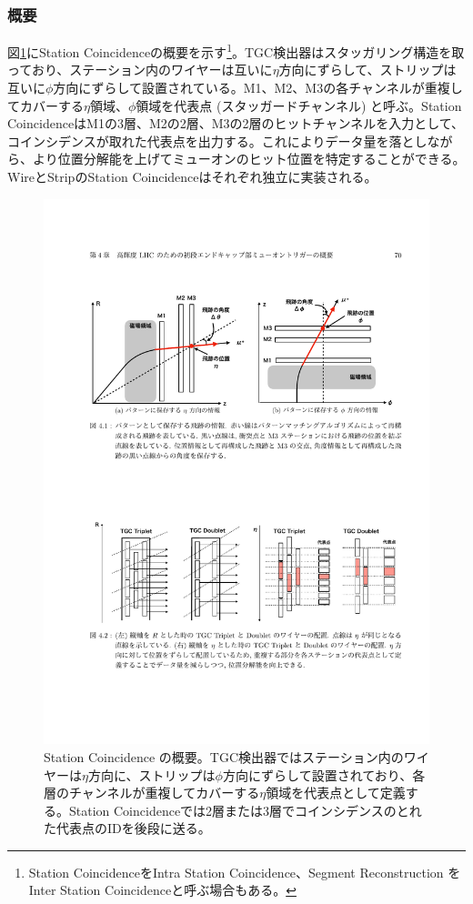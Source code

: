 \subsubsection*{概要}
図\ref{Concept_station}にStation Coincidenceの概要を示す\footnote{Station CoincidenceをIntra Station Coincidence、Segment Reconstruction を Inter Station Coincidenceと呼ぶ場合もある。}。TGC検出器はスタッガリング構造を取っており、ステーション内のワイヤーは互いに$\eta$方向にずらして、ストリップは互いに$\phi$方向にずらして設置されている。M1、M2、M3の各チャンネルが重複してカバーする$\eta$領域、$\phi$領域を代表点 (スタッガードチャンネル) と呼ぶ。Station CoincidenceはM1の3層、M2の2層、M3の2層のヒットチャンネルを入力として、コインシデンスが取れた代表点を出力する。これによりデータ量を落としながら、より位置分解能を上げてミューオンのヒット位置を特定することができる。WireとStripのStation Coincidenceはそれぞれ独立に実装される。

\begin{figure} 
\centering
\includegraphics[width=16cm]{fig/SL/Concept_station.pdf}
\caption[Station コインシデンスの概要]{Station Coincidence の概要\cite{mt_mino}。TGC検出器ではステーション内のワイヤーは$\eta$方向に、ストリップは$\phi$方向にずらして設置されており、各層のチャンネルが重複してカバーする$\eta$領域を代表点として定義する。Station Coincidenceでは2層または3層でコインシデンスのとれた代表点のIDを後段に送る。}
\label{Concept_station}
\end{figure}

